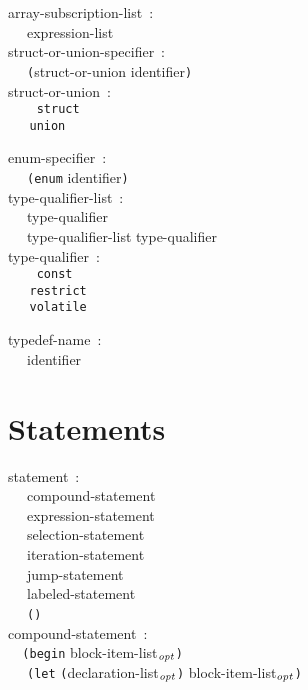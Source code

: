 \documentclass[a4]{article}
\def\|{\verb|} %|
\newcommand{\opt}{$_{{\it opt}}$}
\begin{document}
\noindent
array-subscription-list{\rm \ :} \\
\|  | expression-list \\

\noindent
struct-or-union-specifier{\rm \ :} \\
\|  | {\tt (}struct-or-union identifier{\tt )} \\

\noindent
struct-or-union{\rm \ :} \\ \tt
\|  | struct \\
\|  | union \\ \it

\noindent
enum-specifier{\rm \ :} \\
\|  | {\tt (enum} identifier{\tt )} \\

\noindent
type-qualifier-list{\rm \ :} \\
\|  | type-qualifier \\
\|  | type-qualifier-list type-qualifier \\

\noindent
type-qualifier{\rm \ :} \\ \tt
\|  | const \\
\|  | restrict \\
\|  | volatile \\ \it

\noindent
typedef-name{\rm \ :} \\
\|  | identifier \\
\rm
\section{Statements}

\it

\noindent
statement{\rm \ :} \\
\|  | compound-statement \\
\|  | expression-statement \\
\|  | selection-statement \\
\|  | iteration-statement \\
\|  | jump-statement \\
\|  | labeled-statement \\
\|  | {\tt ()} \\

\noindent
compound-statement{\rm \ :} \\
\|  | {\tt (}{\tt begin} block-item-list\opt{\tt )} \\
\|  | {\tt (}{\tt let} {\tt (}declaration-list\opt {\tt )} block-item-list\opt{\tt )} \\
\end{document}
